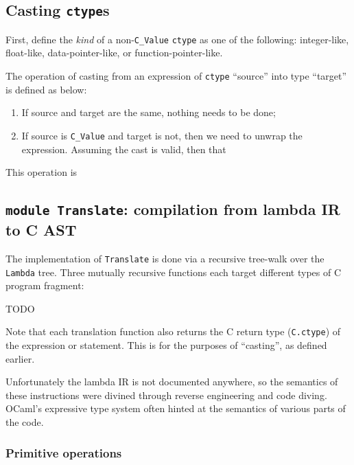\documentclass[12pt,a4paper,twoside,openright]{report}
\begin{document}
\subsection{Casting \texttt{ctype}s}

First, define the \textit{kind} of a non-\lstinline!C_Value! \lstinline!ctype!
as one of the following: integer-like, float-like, data-pointer-like, or
function-pointer-like.

The operation of casting from an expression of \lstinline!ctype! ``source''
into type ``target'' is defined as below:

\begin{enumerate}
  \item If source and target are the same, nothing needs to be done;
  \item If source is \lstinline!C_Value! and target is not, then we need to
    unwrap the expression. Assuming the cast is valid, then 
    that
\end{enumerate}

This operation is 

\subsection{\texttt{module Translate}: compilation from lambda IR to C AST}

The implementation of \lstinline!Translate! is done via a recursive tree-walk
over the \lstinline!Lambda! tree. Three mutually recursive functions each
target different types of C program fragment:

TODO

Note that each translation function also returns the C return type
(\lstinline!C.ctype!) of the expression or statement. This is for the purposes of ``casting'', as defined earlier.

Unfortunately the lambda IR is not documented anywhere, so the semantics
of these instructions were divined through reverse engineering and code diving.
OCaml's expressive type system often hinted at the semantics of various
parts of the code.

\subsubsection{Primitive operations}
\end{document}

